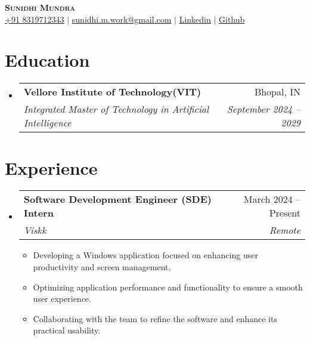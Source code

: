 \documentclass[letterpaper,11pt]{article}
\makeatletter
\newcommand{\resumeItem}[1]{
  \item\small{
    {#1 \vspace{-2pt}}
  }
}
\newcommand{\resumeSubheading}[4]{
  \vspace{-2pt}\item
    \begin{tabular*}{0.97\textwidth}[t]{l@{\extracolsep{\fill}}r}
      \textbf{#1} & #2 \\
      \textit{\small#3} & \textit{\small #4} \\
    \end{tabular*}\vspace{-7pt}
}
\newcommand{\resumeSubHeadingListStart}{\begin{itemize}[leftmargin=0.15in, label={}]}
\newcommand{\resumeSubHeadingListEnd}{\end{itemize}}
\newcommand{\resumeItemListStart}{\begin{itemize}}
\newcommand{\resumeItemListEnd}{\end{itemize}\vspace{-5pt}}
\makeatother
\begin{document}
\begin{center}
    \textbf{\Huge \scshape Sunidhi Mundra} \\ \vspace{1pt}
    \href{tel:+918319712343}{\underline{+91 8319712343}} $|$ \href{mailto:sunidhi.m.work@gmail.com}{\underline{sunidhi.m.work@gmail.com}} $|$ 
    \href{www.linkedin.com/in/sunidhi-mundra}{\underline{Linkedin}} $|$
    \href{https://github.com/foundsunidhi}{\underline{Github}}
\end{center}

\section{Education}
  \resumeSubHeadingListStart
    \resumeSubheading
      {Vellore Institute of Technology(VIT) }{Bhopal, IN}
      {Integrated Master of Technology in Artificial Intelligence}{September 2024 -- 2029}
  \resumeSubHeadingListEnd

\section{Experience}
  \resumeSubHeadingListStart
   \resumeSubheading
      {Software Development Engineer (SDE) Intern}{March 2024 -- Present}
      {Viskk}{Remote}
      \resumeItemListStart
       \resumeItem{Developing a Windows application focused on enhancing user productivity and screen management.}
        \resumeItem{Optimizing application performance and functionality to ensure a smooth user experience.}
        \resumeItem{Collaborating with the team to refine the software and enhance its practical usability.}
      \resumeItemListEnd
  \resumeSubHeadingListEnd

\end{document}
